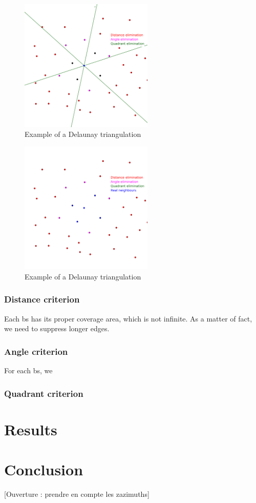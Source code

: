 \documentclass[lettersize,journal,english]{IEEEtran}
\begin{document}
\begin{figure}[!b]
    \centering
    \includegraphics[width=2.5in]{images/illus_crit/quadrant_elim.png}
    \caption{Example of a Delaunay triangulation}
    \label{crit_qua}
\end{figure}

\begin{figure}[!t]
    \centering
    \includegraphics[width=2.5in]{images/illus_crit/neighs.png}
    \caption{Example of a Delaunay triangulation}
    \label{crit_nei}
\end{figure}

\subsubsection{Distance criterion}
Each \acrshort{bs} has its proper coverage area, which is not infinite. As a matter of fact, we need to suppress longer edges.

\subsubsection{Angle criterion}
For each \acrshort{bs}, we 

\subsubsection{Quadrant criterion}

\section{Results}

\section{Conclusion}

[Ouverture : prendre en compte les zazimuths]

\printglossary[type=\acronymtype]
\printglossary



\end{document}

